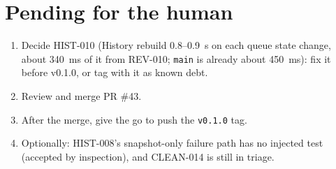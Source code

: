 \documentclass[11pt,a4paper]{article}
\begin{document}
\section*{Pending for the human}

\begin{enumerate}
  \item Decide HIST-010 (History rebuild 0.8--0.9~s on each queue state change, about 340~ms of it
        from REV-010; \texttt{main} is already about 450~ms): fix it before v0.1.0, or tag with it as
        known debt.
  \item Review and merge PR \#43.
  \item After the merge, give the go to push the \texttt{v0.1.0} tag.
  \item Optionally: HIST-008's snapshot-only failure path has no injected test (accepted by
        inspection), and CLEAN-014 is still in triage.
\end{enumerate}
\end{document}
